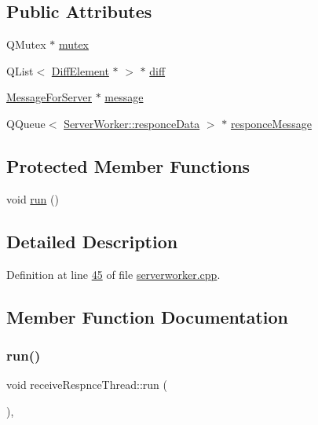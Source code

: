 \subsection*{Public Attributes}
\begin{DoxyCompactItemize}
\item 
Q\+Mutex $\ast$ \hyperlink{a00221_a1945dd1b371f3efa9a07df815c868f96}{mutex}
\item 
Q\+List$<$ \hyperlink{a00141}{Diff\+Element} $\ast$ $>$ $\ast$ \hyperlink{a00221_a77d9cc109e9ebeb4f55d5b753621d0f1}{diff}
\item 
\hyperlink{a00121}{Message\+For\+Server} $\ast$ \hyperlink{a00221_aa3512ecc40fc7e23890c11c08ea4838c}{message}
\item 
Q\+Queue$<$ \hyperlink{a00189}{Server\+Worker\+::responce\+Data} $>$ $\ast$ \hyperlink{a00221_a7f0a11ce86c12c80ca4305eaac48a285}{responce\+Message}
\end{DoxyCompactItemize}
\subsection*{Protected Member Functions}
\begin{DoxyCompactItemize}
\item 
void \hyperlink{a00221_a2087ccd86d00beff7c383049435c93bd}{run} ()
\end{DoxyCompactItemize}


\subsection{Detailed Description}


Definition at line \hyperlink{a00107_source_l00045}{45} of file \hyperlink{a00107_source}{serverworker.\+cpp}.



\subsection{Member Function Documentation}
\mbox{\label{a00221_a2087ccd86d00beff7c383049435c93bd}} 
\subsubsection{\texorpdfstring{run()}{run()}}
{\footnotesize\ttfamily void receive\+Respnce\+Thread\+::run (\begin{DoxyParamCaption}{ }\end{DoxyParamCaption})\hspace{0.3cm}{\ttfamily [inline]}, {\ttfamily [protected]}}



